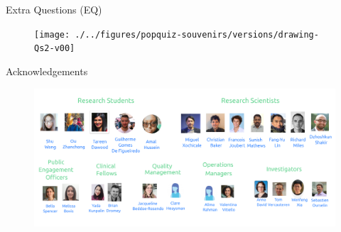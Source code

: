 {
\begin{frame}{Extra Questions (EQ)}
  \begin{figure}
  \centering
  \texttt{[image: ./../figures/popquiz-souvenirs/versions/drawing-Qs2-v00]}
  \end{figure}

\end{frame}
}



{
\begin{frame}{Acknowledgements}

  \begin{figure}
  \centering
  \includegraphics[width=1.0\textwidth]{./../figures/team/versions/drawing-v05.png}
  \end{figure}

\end{frame}
}
